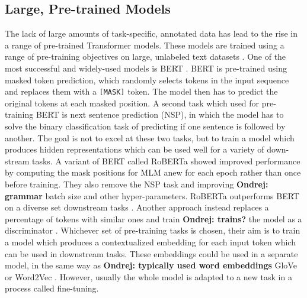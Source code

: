 \documentclass[bsc,deptreport,ai]{infthesis} %
\newcommand{\Ondrej}[1]{{\color{red} \textbf{Ondrej: #1}}}
\begin{document}
\subsection{Large, Pre-trained Models}
\label{sec:pretrained}
The lack of large amounts of task-specific, annotated data has lead to the rise in a range of pre-trained Transformer models. These models are trained using a range of pre-training objectives on large, unlabeled text datasets \citep{transformersurvey}. One of the most successful and widely-used models is BERT \citep{devlin2018}. BERT is pre-trained using masked token prediction, which randomly selects tokens in the input sequence and replaces them with a \texttt{[MASK]} token. The model then has to predict the original tokens at each masked position. A second task which used for pre-training BERT is next sentence prediction (NSP), in which the model has to solve the binary classification task of predicting if one sentence is followed by another. The goal is not to excel at these two tasks, but to train a model which produces hidden representations which can be used well for a variety of down-stream tasks. A variant of BERT called RoBERTa \citep{roberta} showed improved performance by computing the mask positions for MLM anew for each epoch rather than once before training. They also remove the NSP task and improving \Ondrej{grammar} batch size and other hyper-parameters. RoBERTa outperforms BERT on a diverse set downstream tasks \citep{roberta}. Another approach instead replaces a percentage of tokens with similar ones and train \Ondrej{trains?} the model as a discriminator \citep{electra}. Whichever set of pre-training tasks is chosen, their aim is to train a model which produces a contextualized embedding for each input token which can be used in downstream tasks. These embeddings could be used in a separate model, in the same way as \Ondrej{typically used word embeddings} GloVe \citep{pennington2014glove} or Word2Vec \citep{mikolov2013word2vec}. However, usually the whole model is adapted to a new task in a process called fine-tuning.
\end{document}
